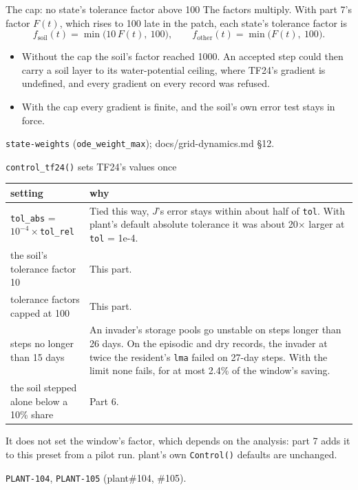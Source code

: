\documentclass[aspectratio=169,10pt]{beamer}
\newcommand{\src}[1]{\par\vfill{\tiny\color{quiet} #1}}
\begin{document}
\begin{frame}{The cap: no state's tolerance factor above 100}
  \small
  The factors multiply. With part 7's factor $F(t)$, which rises to 100 late in the patch, each
  state's tolerance factor is
  \[
    f_{\text{soil}}(t) = \min\big(10\,F(t),\ 100\big), \qquad
    f_{\text{other}}(t) = \min\big(F(t),\ 100\big).
  \]
  \begin{itemize}
    \item Without the cap the soil's factor reached 1000. An accepted step could then carry a
      soil layer to its water-potential ceiling, where TF24's gradient is undefined, and every
      gradient on every record was refused.
    \item With the cap every gradient is finite, and the soil's own error test stays in force.
  \end{itemize}
  \src{\texttt{state-weights} (\texttt{ode\_weight\_max}); docs/grid-dynamics.md \S12.}
\end{frame}

\begin{frame}{\texttt{control\_tf24()} sets TF24's values once}
  \footnotesize
  \begin{tabular}{@{}L{0.3\textwidth}L{0.65\textwidth}@{}}
    \toprule
    setting & why \\
    \midrule
    \texttt{tol\_abs} = $10^{-4}\times$\texttt{tol\_rel}
      & Tied this way, $J$'s error stays within about half of \texttt{tol}. With plant's default
        absolute tolerance it was about 20$\times$ larger at \texttt{tol} = 1e-4. \\
    the soil's tolerance factor 10 & This part. \\
    tolerance factors capped at 100 & This part. \\
    steps no longer than 15 days
      & An invader's storage pools go unstable on steps longer than 26 days. On the episodic and
        dry records, the invader at twice the resident's \texttt{lma} failed on 27-day steps.
        With the limit none fails, for at most 2.4\% of the window's saving. \\
    the soil stepped alone below a 10\% share & Part 6. \\
    \bottomrule
  \end{tabular}
  \medskip

  \small
  It does not set the window's factor, which depends on the analysis: part 7 adds it to this
  preset from a pilot run. plant's own \texttt{Control()} defaults are unchanged.
  \src{\texttt{PLANT-104}, \texttt{PLANT-105} (plant\#104, \#105).}
\end{frame}
\end{document}
